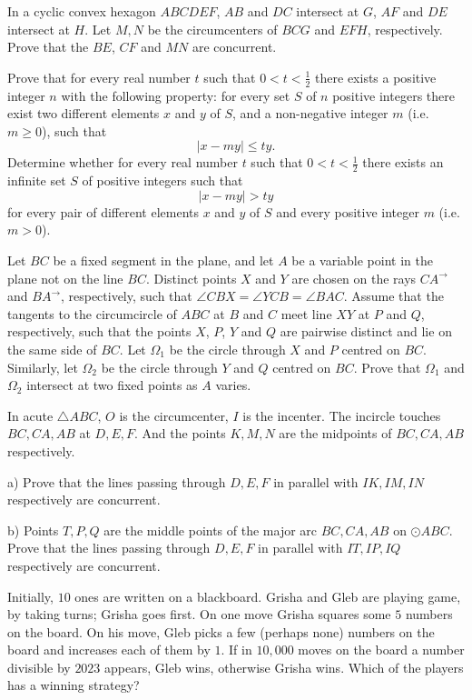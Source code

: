 \documentclass[11pt]{scrartcl}
\begin{document}
\begin{problem}[409530198849693]
In a cyclic convex hexagon $ABCDEF$, $AB$ and $DC$ intersect at $G$, $AF$ and $DE$ intersect at $H$. Let $M, N$ be the circumcenters of $BCG$ and $EFH$, respectively. Prove that the $BE$, $CF$ and $MN$ are concurrent.
\end{problem}
\begin{problem}[412405546768537]
Prove that for every real number $t$ such that $0 < t < \tfrac{1}{2}$ there exists a positive integer $n$ with the following property: for every set $S$ of $n$ positive integers there exist two different elements $x$ and $y$ of $S$, and a non-negative integer $m$ (i.e. $m \ge 0 $), such that\[ |x-my|\leq ty.\]
Determine whether for every real number $t$ such that $0 < t < \tfrac{1}{2} $ there exists an infinite set $S$ of positive integers such that\[|x-my| > ty\]for every pair of different elements $x$ and $y$ of $S$ and every positive integer $m$ (i.e. $m > 0$).
\end{problem}
\begin{problem}[423456312616928]
Let $BC$ be a fixed segment in the plane, and let $A$ be a variable point in the plane not on the line $BC$. Distinct points $X$ and $Y$ are chosen on the rays $CA^\to$ and $BA^\to$, respectively, such that $\angle CBX = \angle YCB = \angle BAC$. Assume that the tangents to the circumcircle of $ABC$ at $B$ and $C$ meet line $XY$ at $P$ and $Q$, respectively, such that the points $X$, $P$, $Y$ and $Q$ are pairwise distinct and lie on the same side of $BC$. Let $\Omega_1$ be the circle through $X$ and $P$ centred on $BC$. Similarly, let $\Omega_2$ be the circle through $Y$ and $Q$ centred on $BC$. Prove that $\Omega_1$ and $\Omega_2$ intersect at two fixed points as $A$ varies.
\end{problem}
\begin{problem}[423911944927735]
In acute $\triangle ABC$, $O$ is the circumcenter, $I$ is the incenter. The incircle touches $BC,CA,AB$ at $D,E,F$. And the points $K,M,N$ are the midpoints of $BC,CA,AB$ respectively.

a) Prove that the lines passing through $D,E,F$ in parallel with $IK,IM,IN$ respectively are concurrent.

b) Points $T,P,Q$ are the middle points of the major arc $BC,CA,AB$ on $\odot ABC$. Prove that the lines passing through $D,E,F$ in parallel with $IT,IP,IQ$ respectively are concurrent.
\end{problem}
\begin{problem}[428632191392819]
Initially, $10$ ones are written on a blackboard. Grisha and Gleb are playing game, by taking turns; Grisha goes first. On one move Grisha squares some $5$ numbers on the board. On his move, Gleb picks a few (perhaps none) numbers on the board and increases each of them by $1$. If in $10,000$ moves on the board a number divisible by $2023$ appears, Gleb wins, otherwise Grisha wins. Which of the players has a winning strategy?
\end{problem}
\end{document}
